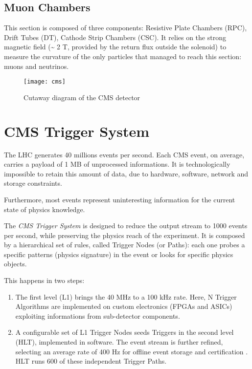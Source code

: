 \subsection{Muon Chambers}

This section is composed of three components: Resistive Plate Chambers (RPC), Drift Tubes (DT), Cathode Strip Chambers (CSC). It relies on the strong magnetic field (\~{} 2 T, provided by the return flux outside the solenoid) to measure the curvature of the only particles that managed to reach this section: muons and neutrinos.


\begin{figure}
	\centerline{
		\texttt{[image: cms]}}
	\caption{Cutaway diagram of the CMS detector \cite{Sakuma_2014}}
	\label{fig:cms}
\end{figure}

\section{CMS Trigger System}


The LHC generates 40 millions events per second. Each CMS event, on average, carries a payload of 1 MB of unprocessed informations. It is technologically impossible to retain this amount of data, due to hardware, software, network and storage constraints.

Furthermore, most events represent uninteresting information for the current state of physics knowledge.

The \textit{CMS Trigger System} is designed to reduce the output stream to 1000 events per second, while preserving the physics reach of the experiment.
It is composed by a hierarchical set of rules, called Trigger Nodes (or Paths): each one probes a specific patterns (physics signature) in the event or looks for specific physics objects.

This happens in two steps:

\begin{enumerate}

	\item The first level (L1) \cite{Bayatyan:706847} brings the 40 MHz to a 100 kHz rate. Here, N Trigger Algorithms are implemented on custom electronics (FPGAs and ASICs) exploiting informations from sub-detector components.

	\item A configurable set of L1 Trigger Nodes seeds Triggers in the second level (HLT), implemented in software. The event stream is further refined, selecting an average rate of 400 Hz for offline event storage and certification \cite{Khachatryan_2017}. HLT runs 600 of these independent Trigger Paths.

\end{enumerate}